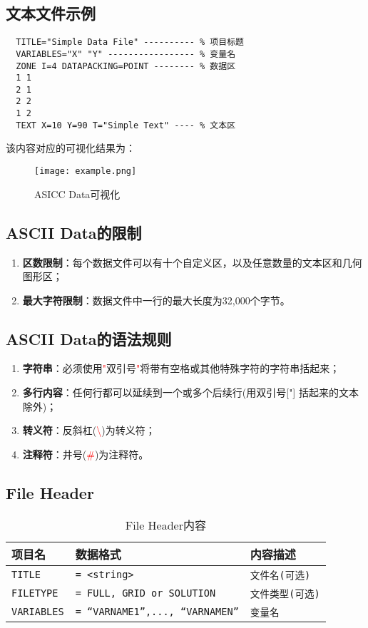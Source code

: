 \documentclass[lang=cn,11pt,a4paper]{elegantpaper}
\begin{document}
\subsection{文本文件示例}
\begin{lstlisting}
  TITLE="Simple Data File" ---------- % 项目标题
  VARIABLES="X" "Y" ----------------- % 变量名
  ZONE I=4 DATAPACKING=POINT -------- % 数据区
  1 1
  2 1
  2 2
  1 2
  TEXT X=10 Y=90 T="Simple Text" ---- % 文本区
\end{lstlisting}

该内容对应的可视化结果为：
\begin{figure}[!htb]
\centering
\texttt{[image: example.png]}
\caption{ASICC Data可视化}
\label{asiccExample}
\end{figure}

\subsection{ASCII Data的限制}
\begin{enumerate}
  \item \textbf{区数限制}：每个数据文件可以有十个自定义区，以及任意数量的文本区和几何图形区；
  \item \textbf{最大字符限制}：数据文件中一行的最大长度为32,000个字节。
\end{enumerate}

\subsection{ASCII Data的语法规则}
\begin{enumerate}
  \item \textbf{字符串}：必须使用\textcolor{red}{"}双引号\textcolor{red}{"}将带有空格或其他特殊字符的字符串括起来；
  \item \textbf{多行内容}：任何行都可以延续到一个或多个后续行(用双引号["] 括起来的文本除外)；
  \item \textbf{转义符}：反斜杠(\textcolor{red}{\textbackslash})为转义符；
  \item \textbf{注释符}：井号(\textcolor{red}{\#})为注释符。
\end{enumerate}

\subsection{File Header}\label{fileHeader}
\begin{table}[!htb]
  \centering
  \caption{File Header内容}
  \begin{tabular}{*{3}{l}}
   \hline
   \textbf{项目名} & \textbf{数据格式} & \textbf{内容描述} \\
   \hline
   \texttt{TITLE} & \texttt{= <string>} & \texttt{文件名(可选)} \\
   \texttt{FILETYPE} & \texttt{= FULL, GRID or SOLUTION} & \texttt{文件类型(可选)} \\
   \texttt{VARIABLES} & \texttt{= “VARNAME1”,..., “VARNAMEN”} & \texttt{变量名} \\
   \hline
  \end{tabular}
\end{table}
\end{document}
